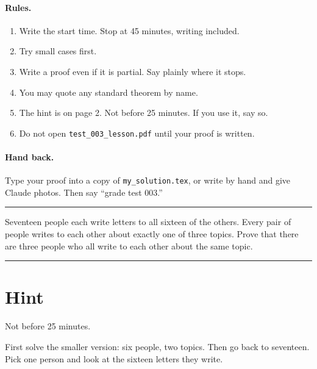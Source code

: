 \documentclass[11pt]{article}
\begin{document}

\paragraph{Rules.}
\begin{enumerate}
  \item Write the start time. Stop at 45 minutes, writing included.
  \item Try small cases first.
  \item Write a proof even if it is partial. Say plainly where it stops.
  \item You may quote any standard theorem by name.
  \item The hint is on page 2. Not before 25 minutes. If you use it, say so.
  \item Do not open \texttt{test\_003\_lesson.pdf} until your proof is written.
\end{enumerate}

\paragraph{Hand back.} Type your proof into a copy of \texttt{my\_solution.tex}, or write by hand and give Claude photos. Then say ``grade test 003.''

\vspace{10pt}\hrule\vspace{10pt}

\begin{problem}
Seventeen people each write letters to all sixteen of the others. Every pair of people writes to each other about exactly one of three topics. Prove that there are three people who all write to each other about the same topic.
\end{problem}

\vspace{10pt}\hrule

\clearpage
\section*{Hint}
Not before 25 minutes.

\spoilerspace
\begin{hint}
First solve the smaller version: six people, two topics. Then go back to seventeen. Pick one person and look at the sixteen letters they write.
\end{hint}
\end{document}
